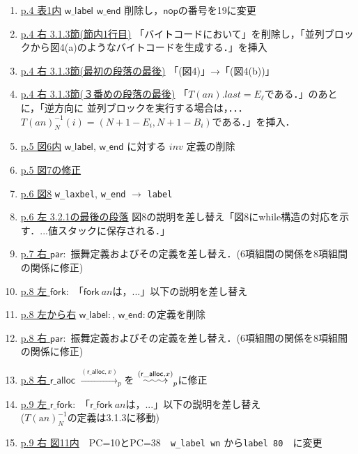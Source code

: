 \documentclass{jarticle}
\makeatletter
\newcommand{\longsquiggly}{\xymatrix{{}\ar@{~>}[r]&{}}}
\newcommand{\brightarrow}[1]{\stackrel{#1}{\longsquiggly}}
\newcommand{\alabel}[1]{\mathrm{a}#1}
\makeatother
\begin{document}
\begin{enumerate}
\item \underline{p.4 表1内} $\mathsf{w\_label}$ $\mathsf{w\_end}$ 削除し，$\mathsf{nop}$の番号を19に変更
\item \underline{p.4 右 3.1.3節(節内1行目)} 「バイトコードにおいて」を削除し，「並列ブロックから図4(a)のようなバイトコードを生成する．」を挿入
\item \underline{p.4 右 3.1.3節(最初の段落の最後)} 「(図4)」→「(図4(b))」
\item \underline{p.4 右 3.1.3節(３番めの段落の最後)} 「$T(an).last=E_\ell$である．」のあとに，「逆方向に
並列ブロックを実行する場合は，．．．$T(an)^{-1}_N(i)=(N+1-E_i,N+1-B_i)$である．」を挿入．
\item \underline{p.5 図6内} $\mathsf{w\_label}$, $\mathsf{w\_end}$ に対する $inv$ 定義の削除
\item \underline{p.5 図7の修正}
\item \underline{p.6 図8} \texttt{w\_laxbel}, \texttt{w\_end} $\rightarrow$ \texttt{label}
\item \underline{p.6 左 3.2.1の最後の段落} 図8の説明を差し替え「図8にwhile構造の対応を示す．...値スタックに保存される．」
\item \underline{p.7 右 $\mathsf{par:}$} 振舞定義およびその定義を差し替え．(6項組間の関係を8項組間の関係に修正)
\item \underline{p.8 左 $\mathsf{fork:}$} 「$\mathsf{fork}\ an$は，...」以下の説明を差し替え
\item \underline{p.8 左から右} $\mathsf{w\_label:}$, $\mathsf{w\_end:}$の定義を削除
\item \underline{p.8 右 $\mathsf{par:}$} 振舞定義およびその定義を差し替え．(6項組間の関係を8項組間の関係に修正)
\item \underline{p.8 右 $\mathsf{r\_alloc}$} $\xrightarrow{(\mathsf{r\_alloc},x)}_p$を
$\brightarrow{(\mathsf{r\_alloc},x)}_p$に修正
\item \underline{p.9 左 $\mathsf{r\_fork:}$} 「$\mathsf{r\_fork}\ an$は，...」以下の説明を差し替え\\
($T(\alabel{n})^{-1}_N$の定義は3.1.3に移動)
\item \underline{p.9 右 図11内}　PC=10とPC=38　\texttt{w\_label wn} から\texttt{label 80}　に変更\\

\end{enumerate}
\end{document}
